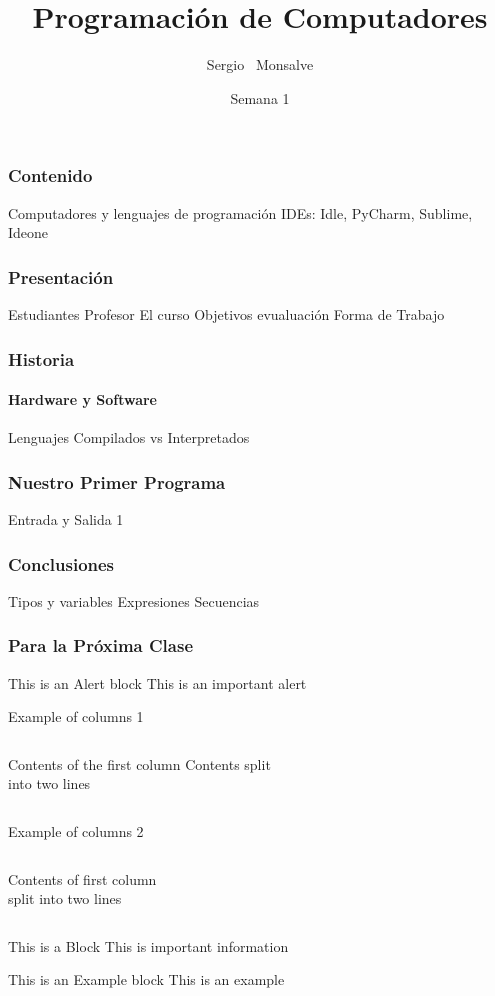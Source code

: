 \documentclass{beamer}
\title[ProgComp] %
      {Programación de Computadores}
\author%
             {Sergio ~Monsalve\inst{1}} %
\institute%
                       {
                         \inst{1}%
                         Ingeniería de Sistemas\\
                         Departamento de Informatica\\
                         Universidad EAFIT
                       }
\date[\today] %
                            {Semana 1}
\begin{document}
                            
\frame{\titlepage}


\begin{frame}
  \frametitle{Contenido}
  Computadores y lenguajes de programación
  IDEs: Idle, PyCharm, Sublime, Ideone
\end{frame}

\begin{frame}
  \frametitle{Presentación}
  Estudiantes
  Profesor
  El curso
  Objetivos
  evualuación
  Forma de Trabajo
\end{frame}

\begin{frame}
  \frametitle{Historia}
  \framesubtitle{Hardware y Software}
    Lenguajes Compilados vs Interpretados
\end{frame}


\begin{frame}
  \frametitle{Nuestro Primer Programa}
      Entrada y Salida 1
\end{frame}


\begin{frame}
  \frametitle{Conclusiones}
    Tipos y variables
    Expresiones
    Secuencias
\end{frame}


\begin{frame}
  \frametitle{Para la Próxima Clase}

  \begin{alertblock}{This is an Alert block}
    This is an important alert
  \end{alertblock}

\end{frame}


\begin{frame}{Example of columns 1}
  \begin{columns}[c] %
    Contents of the first column
    Contents split \\ into two lines
  \end{columns}
\end{frame}

\begin{frame}{Example of columns 2}
  \begin{columns}[T] %
    \begin{column}[T]{5cm} %
      Contents of first column \\ split into two lines
    \end{column}
    \begin{column}[T]{5cm} %
      
    \end{column}
  \end{columns}
  \end{frame}

\begin{frame}

  \begin{block}{This is a Block}
    This is important information
  \end{block}

  \begin{exampleblock}{This is an Example block}
    This is an example
  \end{exampleblock}

  \end{frame}
\end{document}
